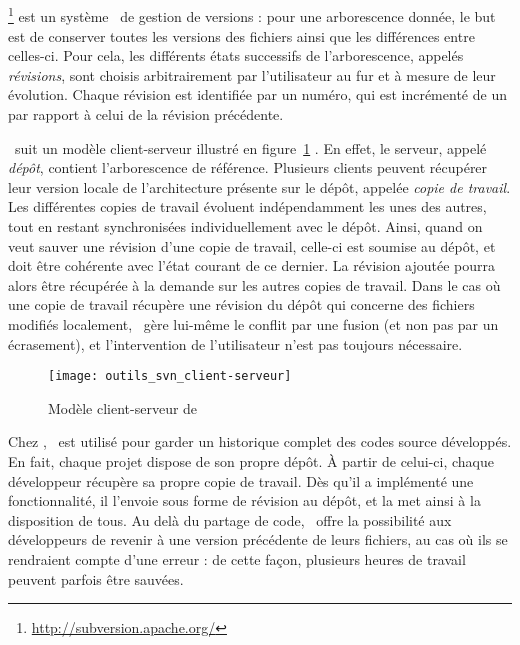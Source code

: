 \subsection{\asvn}
\label{section:outils_svn}

\asvn\footnote{\url{http://subversion.apache.org/}} est un système \aos\ de gestion de versions : pour une arborescence donnée, le but est de conserver toutes les versions des fichiers ainsi que les différences entre celles-ci. Pour cela, les différents états successifs de l'arborescence, appelés \emph{révisions}, sont choisis arbitrairement par l'utilisateur au fur et à mesure de leur évolution. Chaque révision est identifiée par un numéro, qui est incrémenté de un par rapport à celui de la révision précédente.

\asvn\ suit un modèle client-serveur illustré en figure~\ref{figure:outils_svn_client-serveur} . En effet, le serveur, appelé \emph{dépôt}, contient l'arborescence de référence. Plusieurs clients peuvent récupérer leur version locale de l'architecture présente sur le dépôt, appelée \emph{copie de travail}. Les différentes copies de travail évoluent indépendamment les unes des autres, tout en restant synchronisées individuellement avec le dépôt. Ainsi, quand on veut sauver une révision d'une copie de travail, celle-ci est soumise au dépôt, et doit être cohérente avec l'état courant de ce dernier. La révision ajoutée pourra alors être récupérée à la demande sur les autres copies de travail. Dans le cas où une copie de travail récupère une révision du dépôt qui concerne des fichiers modifiés localement, \asvn\ gère lui-même le conflit par une fusion (et non pas par un écrasement), et l'intervention de l'utilisateur n'est pas toujours nécessaire.

\begin{figure}
	\centering
	\texttt{[image: outils\_svn\_client-serveur]}
	\caption{Modèle client-serveur de \asvn}
	\label{figure:outils_svn_client-serveur}
\end{figure}

Chez \asl, \asvn\ est utilisé pour garder un historique complet des codes source développés. En fait, chaque projet dispose de son propre dépôt. À partir de celui-ci, chaque développeur récupère sa propre copie de travail. Dès qu'il a implémenté une fonctionnalité, il l'envoie sous forme de révision au dépôt, et la met ainsi à la disposition de tous. Au delà du partage de code, \asvn\ offre la possibilité aux développeurs de revenir à une version précédente de leurs fichiers, au cas où ils se rendraient compte d'une erreur : de cette façon, plusieurs heures de travail peuvent parfois être sauvées.
